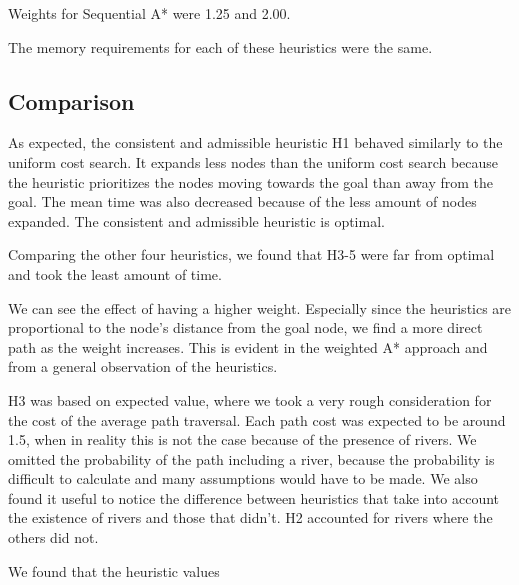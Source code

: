 Weights for Sequential A* were 1.25 and 2.00.

The memory requirements for each of these heuristics were the same.

\subsection{Comparison}



As expected, the consistent and admissible heuristic H1 behaved similarly to the uniform cost search. It expands less nodes than the uniform cost search because the heuristic prioritizes the nodes moving towards the goal than away from the goal. The mean time was also decreased because of the less amount of nodes expanded.
The consistent and admissible heuristic is optimal.

Comparing the other four heuristics, we found that H3-5 were far from optimal and took the least amount of time.

We can see the effect of having a higher weight. Especially since the heuristics are proportional to the node's distance from the goal node, we find a more direct path as the weight increases. This is evident in the weighted A* approach and from a general observation of the heuristics.

H3 was based on expected value, where we took a very rough consideration for the cost of the average path traversal. Each path cost was expected to be around 1.5, when in reality this is not the case because of the presence of rivers. We omitted the probability of the path including a river, because the probability is difficult to calculate and many assumptions would have to be made. We also found it useful to notice the difference between heuristics that take into account the existence of rivers and those that didn't. H2 accounted for rivers where the others did not.

We found that the heuristic values
